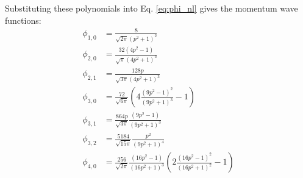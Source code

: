 \documentclass[12pt]{article}
\begin{document}
Substituting these polynomials into Eq. \ref{eq:phi_nl} gives the momentum wave functions:
\begin{align*}
\phi_{1,0}&=\frac{8}{\sqrt{2\pi}(p^2+1)^2}\\
\phi_{2,0}&=\frac{32(4p^2-1)}{\sqrt{\pi}(4p^2+1)^3}\\
\phi_{2,1}&=\frac{128p}{\sqrt{3\pi}(4p^2+1)^3}\\
\phi_{3,0}&=\frac{72}{\sqrt{6\pi}}\left(4\frac{(9p^2-1)^2}{(9p^2+1)^3}-1\right)\\
\phi_{3,1}&=\frac{864p}{\sqrt{3\pi}}\frac{(9p^2-1)}{(9p^2+1)^3}\\
\phi_{3,2}&=\frac{5184}{\sqrt{15\pi}}\frac{p^2}{(9p^2+1)^4}\\
\phi_{4,0}&=\frac{256}{\sqrt{2\pi}}\frac{(16p^2-1)}{(16p^2+1)^3}\left(2\frac{(16p^2-1)^2}{(16p^2+1)^2}-1\right)
\end{align*}
%


\end{document}
